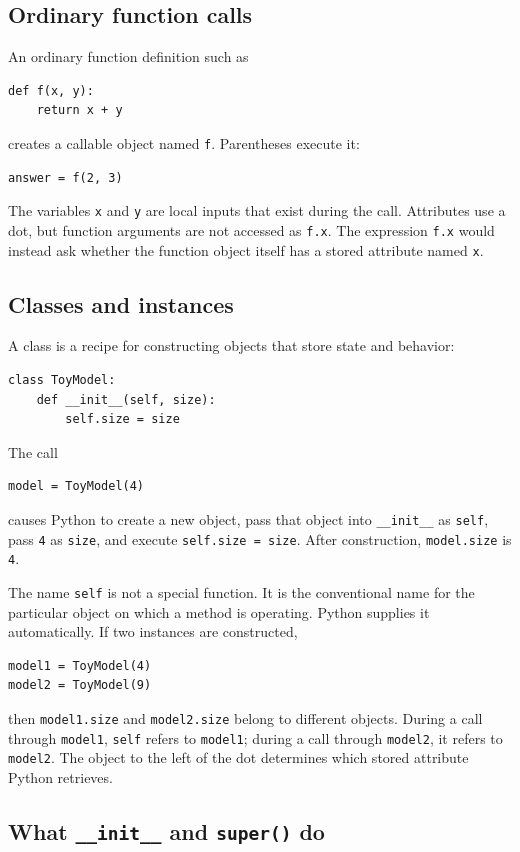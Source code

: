 \documentclass[11pt]{article}
\begin{document}
\subsection{Ordinary function calls}

An ordinary function definition such as
\begin{lstlisting}
def f(x, y):
    return x + y
\end{lstlisting}
creates a callable object named \texttt{f}. Parentheses execute it:
\begin{lstlisting}
answer = f(2, 3)
\end{lstlisting}
The variables \texttt{x} and \texttt{y} are local inputs that exist during the call. Attributes use a dot,
but function arguments are not accessed as \texttt{f.x}. The expression \texttt{f.x} would instead ask whether
the function object itself has a stored attribute named \texttt{x}.

\subsection{Classes and instances}

A class is a recipe for constructing objects that store state and behavior:
\begin{lstlisting}
class ToyModel:
    def __init__(self, size):
        self.size = size
\end{lstlisting}
The call
\begin{lstlisting}
model = ToyModel(4)
\end{lstlisting}
causes Python to create a new object, pass that object into \texttt{\_\_init\_\_} as \texttt{self}, pass
\texttt{4} as \texttt{size}, and execute \texttt{self.size = size}. After construction,
\texttt{model.size} is \texttt{4}.

The name \texttt{self} is not a special function. It is the conventional name for the particular object on
which a method is operating. Python supplies it automatically. If two instances are constructed,
\begin{lstlisting}
model1 = ToyModel(4)
model2 = ToyModel(9)
\end{lstlisting}
then \texttt{model1.size} and \texttt{model2.size} belong to different objects. During a call through
\texttt{model1}, \texttt{self} refers to \texttt{model1}; during a call through \texttt{model2}, it refers to
\texttt{model2}. The object to the left of the dot determines which stored attribute Python retrieves.

\subsection{What \texttt{\_\_init\_\_} and \texttt{super()} do}
\end{document}
